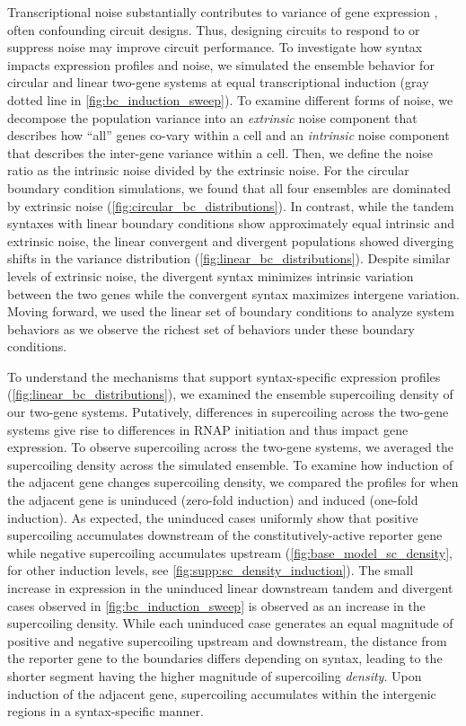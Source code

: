 \documentclass[11pt]{article}
\begin{document}
Transcriptional noise substantially contributes to variance of gene expression \parencite{quartonUncouplingGeneExpression2020}, often confounding circuit designs. Thus, designing circuits to respond to or suppress noise may improve circuit performance. To investigate how syntax impacts expression profiles and noise, we simulated the ensemble behavior for circular and linear two-gene systems at equal transcriptional induction (gray dotted line in \cref{fig:bc_induction_sweep}). To examine different forms of noise, we decompose the population variance into an \emph{extrinsic} noise component that describes how ``all'' genes co-vary within a cell and an \emph{intrinsic} noise component that describes the inter-gene variance within a cell. Then, we define the noise ratio as the intrinsic noise divided by the extrinsic noise. For the circular boundary condition simulations, we found that all four ensembles are dominated by extrinsic noise (\cref{fig:circular_bc_distributions}). In contrast, while the tandem syntaxes with linear boundary conditions show approximately equal intrinsic and extrinsic noise, the linear convergent and divergent populations showed diverging shifts in the variance distribution (\cref{fig:linear_bc_distributions}). Despite similar levels of extrinsic noise, the divergent syntax minimizes intrinsic variation between the two genes while the convergent syntax maximizes intergene variation. 
Moving forward, we used the linear set of boundary conditions to analyze system behaviors as we observe the richest set of behaviors under these boundary conditions.

To understand the mechanisms that support syntax-specific expression profiles (\cref{fig:linear_bc_distributions}), we examined the ensemble supercoiling density of our two-gene systems. Putatively, differences in supercoiling across the two-gene systems give rise to differences in RNAP initiation and thus impact gene expression. To observe supercoiling across the two-gene systems, we averaged the supercoiling density across the simulated ensemble. To examine how induction of the adjacent gene changes supercoiling density, we compared the profiles for when the adjacent gene is uninduced (zero-fold induction) and induced (one-fold induction). As expected, the uninduced cases uniformly show that positive supercoiling accumulates downstream of the constitutively-active reporter gene while negative supercoiling accumulates upstream (\cref{fig:base_model_sc_density}, for other induction levels, see \cref{fig:supp:sc_density_induction}). The small increase in expression in the uninduced linear downstream tandem and divergent cases observed in \cref{fig:bc_induction_sweep} is observed as an increase in the supercoiling density. While each uninduced case generates an equal magnitude of positive and negative supercoiling upstream and downstream, the distance from the reporter gene to the boundaries differs depending on syntax, leading to the shorter segment having the higher magnitude of supercoiling \emph{density}. Upon induction of the adjacent gene, supercoiling accumulates within the intergenic regions in a syntax-specific manner.
\end{document}
